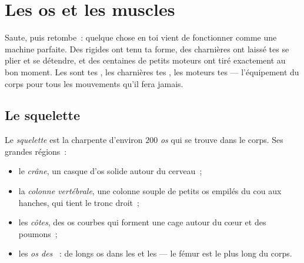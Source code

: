 \chapter{Les os et les muscles}\label{ch:g3:bones-and-muscles}

Saute, puis retombe~: quelque chose en toi vient de fonctionner
comme une machine parfaite. Des  rigides ont tenu ta forme, des
charnières ont laissé tes  se plier et se détendre, et des
centaines de petits moteurs ont tiré exactement au bon moment. Les
 sont tes , les charnières tes , les moteurs tes
 --- l'équipement du corps pour tous les mouvements qu'il
fera jamais.

\section{Le squelette}

\begin{definition}[Squelette et os]\label{def:g3:bones-and-muscles:skeleton}
Le \emph{squelette} est la charpente d'environ
$200$ \emph{os} qui se trouve dans le corps. Ses grandes
régions~:
\begin{itemize}
  \item le \emph{crâne}, un casque d'os solide autour
        du cerveau~;
  \item la \emph{colonne vertébrale}, une
        colonne souple de petits os empilés du cou aux hanches, qui
        tient le tronc droit~;
  \item les \emph{côtes}, des os courbes qui forment
        une cage autour du cœur et des poumons~;
  \item les \emph{os des }~: de longs os dans les  et
        les  --- le fémur est le plus long du corps.
\end{itemize}
\end{definition}

